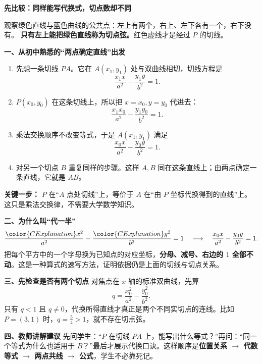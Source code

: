 \begin{explanationbox}
\textbf{\textcolor{CExplanation}{先比较：同样能写代换式，切点数却不同}}
\begin{center}

\end{center}
观察绿色直线与蓝色曲线的公共点：左上有两个，右上、左下各有一个，右下没有。
\textbf{只有左上能把绿色直线称为切点弦。}红色虚线才是经过 $P$ 的切线。

\textbf{\textcolor{CExplanation}{一、从初中熟悉的“两点确定直线”出发}}
\begin{enumerate}[leftmargin=*,itemsep=0.45em]
\item 先想一条切线 $PA$。它在 $A(x_1,y_1)$ 处与双曲线相切，切线方程是
\[\frac{x_1x}{a^2}-\frac{y_1y}{b^2}=1.\]
\item $P(x_0,y_0)$ 在这条切线上，所以把 $x=x_0,y=y_0$ 代进去：
\[\frac{x_1x_0}{a^2}-\frac{y_1y_0}{b^2}=1.\]
\item 乘法交换顺序不改变等式，于是 $A(x_1,y_1)$ 满足
\[\frac{x_0x}{a^2}-\frac{y_0y}{b^2}=1.\]
\item 对另一个切点 $B$ 重复同样的步骤。这样 $A,B$ 同在这条直线上；由两点确定一条直线，它就是 $AB$。
\end{enumerate}
\textbf{关键一步：} $P$ 在“$A$ 点处切线”上，等价于 $A$ 在“由 $P$ 坐标代换得到的直线”上。这只是乘法交换律，不需要大学数学知识。

\medskip
\textbf{\textcolor{CExplanation}{二、为什么叫“代一半”}}
\[
\frac{\color{CExplanation}x^2}{a^2}-\frac{\color{CExplanation}y^2}{b^2}=1
\quad\longrightarrow\quad
\frac{x_0x}{a^2}-\frac{y_0y}{b^2}=1.
\]
把每个平方中的一个字母换为已知点的对应坐标，\textbf{分母、减号、右边的 $1$ 全部不动}。这是一种算式的速写方法，证明依据仍是上面的切线与切点关系。

\medskip
\textbf{\textcolor{CExplanation}{三、先检查是否有两个切点}}
对焦点在 $x$ 轴的标准双曲线，先算
\[q=\frac{x_0^2}{a^2}-\frac{y_0^2}{b^2}.\]
只有 $q<1$ 且 $q\ne0$，代换所得直线才真正是两个不同实切点的连线。比如 $P=(3,1)$ 时，$q=\frac54>1$，就不存在切点弦。

\medskip
\textbf{\textcolor{CExplanation}{四、教师讲解建议}}
先问学生：“$P$ 在切线 $PA$ 上，能写出什么等式？”再问：“同一个等式为什么也适用于 $B$？”最后才展示代换口诀。这样顺序是\textbf{位置关系 $\to$ 代数等式 $\to$ 两点共线 $\to$ 公式}，学生不必靠死记。
\end{explanationbox}
